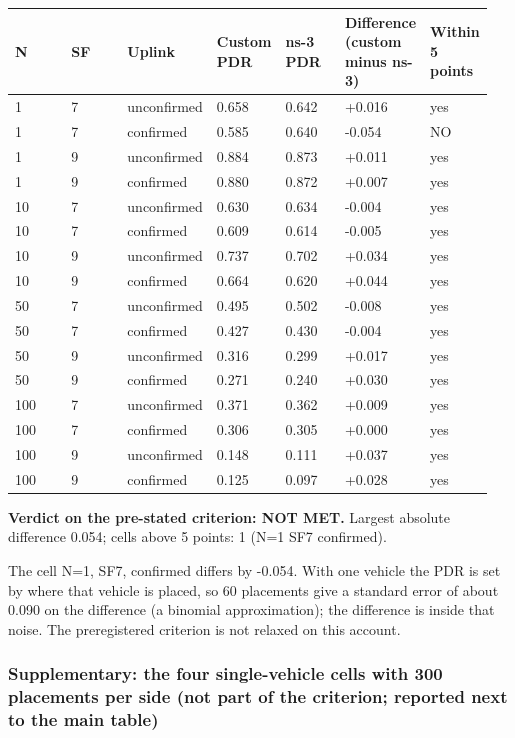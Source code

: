 {\scriptsize\raggedright
\begin{longtable}{p{0.136\linewidth}p{0.136\linewidth}p{0.136\linewidth}p{0.136\linewidth}p{0.136\linewidth}p{0.136\linewidth}p{0.136\linewidth}}
\toprule
N & SF & Uplink & Custom PDR & ns-3 PDR & Difference (custom minus ns-3) & Within 5 points \\
\midrule
\endhead
1 & 7 & unconfirmed & 0.658 & 0.642 & +0.016 & yes \\
1 & 7 & confirmed & 0.585 & 0.640 & -0.054 & NO \\
1 & 9 & unconfirmed & 0.884 & 0.873 & +0.011 & yes \\
1 & 9 & confirmed & 0.880 & 0.872 & +0.007 & yes \\
10 & 7 & unconfirmed & 0.630 & 0.634 & -0.004 & yes \\
10 & 7 & confirmed & 0.609 & 0.614 & -0.005 & yes \\
10 & 9 & unconfirmed & 0.737 & 0.702 & +0.034 & yes \\
10 & 9 & confirmed & 0.664 & 0.620 & +0.044 & yes \\
50 & 7 & unconfirmed & 0.495 & 0.502 & -0.008 & yes \\
50 & 7 & confirmed & 0.427 & 0.430 & -0.004 & yes \\
50 & 9 & unconfirmed & 0.316 & 0.299 & +0.017 & yes \\
50 & 9 & confirmed & 0.271 & 0.240 & +0.030 & yes \\
100 & 7 & unconfirmed & 0.371 & 0.362 & +0.009 & yes \\
100 & 7 & confirmed & 0.306 & 0.305 & +0.000 & yes \\
100 & 9 & unconfirmed & 0.148 & 0.111 & +0.037 & yes \\
100 & 9 & confirmed & 0.125 & 0.097 & +0.028 & yes \\
\bottomrule
\end{longtable}}

\textbf{Verdict on the pre-stated criterion: NOT MET.} Largest absolute difference 0.054; cells above 5 points: 1 (N=1 SF7 confirmed).

The cell N=1, SF7, confirmed differs by -0.054. With one vehicle the PDR is set by where that vehicle is placed, so 60 placements give a standard error of about 0.090 on the difference (a binomial approximation); the difference is inside that noise. The preregistered criterion is not relaxed on this account.

\subsubsection*{Supplementary: the four single-vehicle cells with 300 placements per side (not part of the criterion; reported next to the main table)}

